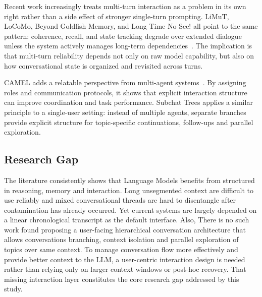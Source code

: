 \documentclass[pdflatex,sn-mathphys-num]{sn-jnl}%
\theoremstyle{thmstyleone}%
\theoremstyle{thmstyletwo}%
\theoremstyle{thmstylethree}%
\begin{document}
Recent work increasingly treats multi-turn interaction as a problem in its own right rather than a side effect of stronger single-turn prompting. LiMuT, LoCoMo, Beyond Goldfish Memory, and Long Time No See! all point to the same pattern: coherence, recall, and state tracking degrade over extended dialogue unless the system actively manages long-term dependencies~\cite{laban2024limt,maharana2024locomo,xu2022goldfish,xu2022longpersona}. The implication is that multi-turn reliability depends not only on raw model capability, but also on how conversational state is organized and revisited across turns.

CAMEL adds a relatable perspective from multi-agent systems~\cite{li2023camel}. By assigning roles and communication protocols, it shows that explicit interaction structure can improve coordination and task performance. Subchat Trees applies a similar principle to a single-user setting: instead of multiple agents, separate branches provide explicit structure for topic-specific continuations, follow-ups and parallel exploration.



\subsection{Research Gap}\label{subsec:gap}




The literature consistently shows that Language Models benefits from structured in reasoning, memory and interaction. Long unsegmented context are difficult to use reliably and mixed conversational threads are hard to disentangle after contamination has already occurred. Yet current systems are largely depended on a linear chronological transcript as the default interface. Also, There is no such work found proposing a user-facing hierarchical conversation architecture that allows conversations branching, context isolation and parallel exploration of topics over same context. To manage conversation flow more effectively and provide better context to the LLM, a user-centric interaction design is needed rather than relying only on larger context windows or post-hoc recovery. That missing interaction layer constitutes the core research gap addressed by this study.
\end{document}
